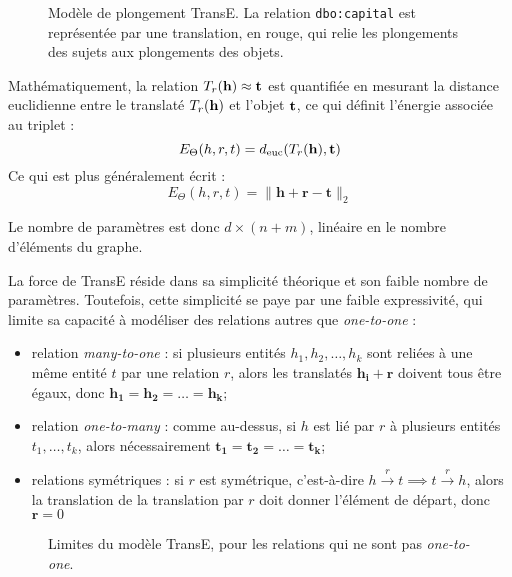 \begin{figure}
    \centering
    
    \caption[Principe du modèle TransE]{Modèle de plongement TransE. La relation \texttt{dbo:capital} est représentée par une translation, en rouge, qui relie les plongements des sujets aux plongements des objets.}
    \label{fig:transe-intuition}
\end{figure}

Mathématiquement, la relation $T_r(\bf{h}) \approx \bf{t}$ est quantifiée en mesurant la distance euclidienne entre le translaté $T_r(\bf{h})$ et l'objet $\bf{t}$, ce qui définit l'énergie associée au triplet :
\begin{equation}
    E_\Theta(h, r, t) =  d_\text{euc}(T_r(\bf{h}), \bf{t})
    \label{eq:transe-mainvar}
\end{equation}
Ce qui est plus généralement écrit :
\begin{equation}
    E_\Theta(h, r, t) = \| \mathbf{h + r - t} \|_2
    \label{eq:transe-main}
\end{equation}

Le nombre de paramètres est donc $d \times (n + m)$, linéaire en le nombre d'éléments du graphe. 

La force de TransE réside dans sa simplicité théorique et son faible nombre de paramètres. Toutefois, cette simplicité se paye par une faible expressivité, qui limite sa capacité à modéliser des relations autres que \textit{one-to-one} :
\begin{itemize}
    \item relation \textit{many-to-one} : si plusieurs entités $h_1, h_2, \ldots, h_k$ sont reliées à une même entité $t$ par une relation $r$, alors les translatés $\mathbf{h_i + r}$ doivent tous être égaux, donc $\mathbf{h_1  = h_2 = \ldots = h_k}$;
    \item relation \textit{one-to-many} : comme au-dessus, si $h$ est lié par $r$ à plusieurs entités $t_1, \ldots, t_k$, alors nécessairement $\mathbf{t_1 = t_2 = \ldots = t_k}$;
    \item relations symétriques : si $r$ est symétrique, c'est-à-dire $h  \overset{r} \rightarrow t \implies t   \overset{r} \rightarrow h$, alors la translation de la translation par $r$ doit donner l'élément de départ, donc $\mathbf{r} = 0$
\end{itemize}

\begin{figure}[h]
    \centering
    
    \caption[Limites du modèle TransE]{Limites du modèle TransE, pour les relations qui ne sont pas \textit{one-to-one}.}
    \label{fig:transe-limitation}
\end{figure}

